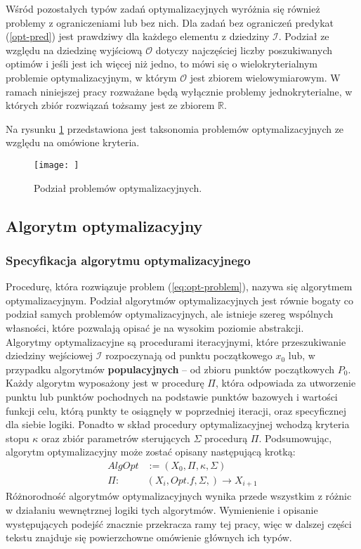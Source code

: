 Wśród pozostałych typów zadań optymalizacyjnych wyróżnia się również problemy z ograniczeniami lub bez nich. Dla zadań bez ograniczeń predykat (\ref{opt-pred}) jest prawdziwy dla każdego elementu z dziedziny $\mathcal{I}$. Podział ze względu na dziedzinę wyjściową $\mathcal{O}$ dotyczy najczęściej liczby poszukiwanych optimów i jeśli jest ich więcej niż jedno, to mówi się o wielokryterialnym problemie optymalizacyjnym, w którym $\mathcal{O}$ jest zbiorem wielowymiarowym. W ramach niniejszej pracy rozważane będą wyłącznie problemy jednokryterialne, w których zbiór rozwiązań tożsamy jest ze zbiorem $\mathbb{R}$.

Na rysunku \ref{fig:optim-taks} przedstawiona jest taksonomia problemów optymalizacyjnych ze względu na omówione kryteria. 

\begin{figure}
    \centering
    \texttt{[image: ]}
    \caption{Podział problemów optymalizacyjnych.}
    \label{fig:optim-taks}
\end{figure}


\subsection{Algorytm optymalizacyjny \label{subsec:optim-alg}}

\subsubsection{Specyfikacja algorytmu optymalizacyjnego}
Procedurę, która rozwiązuje problem (\ref{eq:opt-problem}), nazywa się algorytmem optymalizacyjnym. Podział algorytmów optymalizacyjnych jest równie bogaty co podział samych problemów optymalizacyjnych, ale istnieje szereg wspólnych własności, które pozwalają opisać je na wysokim poziomie abstrakcji. \\
Algorytmy optymalizacyjne są procedurami iteracyjnymi, które przeszukiwanie dziedziny wejściowej $\mathcal{I}$ rozpoczynają od punktu początkowego $x_0$ lub, w przypadku algorytmów \textbf{populacyjnych} -- od zbioru punktów początkowych $P_0$. Każdy algorytm wyposażony jest w procedurę $\Pi$, która odpowiada za utworzenie punktu lub punktów pochodnych na podstawie punktów bazowych i wartości funkcji celu, którą punkty te osiągnęły w poprzedniej iteracji, oraz specyficznej dla siebie logiki. Ponadto w skład procedury optymalizacyjnej wchodzą kryteria stopu $\kappa$ oraz zbiór parametrów sterujących $\Sigma$ procedurą $\Pi$. Podsumowując, algorytm optymalizacyjny może zostać opisany następującą krotką:
\begin{align*}
 AlgOpt &:= \left( X_0, \Pi, \kappa, \Sigma \right) \\
 \Pi\colon\; & \left(X_i, Opt.f, \Sigma, \right) \rightarrow X_{i+1}
\end{align*}
Różnorodność algorytmów optymalizacyjnych wynika przede wszystkim z różnic w działaniu wewnętrznej logiki tych algorytmów. Wymienienie i opisanie występujących podejść znacznie przekracza ramy tej pracy, więc w dalszej części tekstu znajduje się powierzchowne omówienie głównych ich typów.
